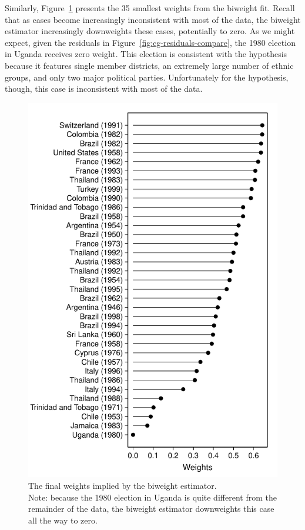 \documentclass[12pt]{article}
\begin{document}
Similarly, Figure~\ref{fig:cg-weights} presents the 35 smallest weights from the biweight fit. 
Recall that as cases become increasingly inconsistent with most of the data, the biweight estimator increasingly downweights these cases, potentially to zero. 
As we might expect, given the residuals in Figure~\ref{fig:cg-residuals-compare}, the 1980 election in Uganda receives zero weight. 
This election is consistent with the hypothesis because it features single member districts, an extremely large number of ethnic groups, and only two major political parties. 
Unfortunately for the hypothesis, though, this case is inconsistent with most of the data.

\begin{figure}[h!]
\begin{center}
\includegraphics[scale = 0.7]{figs/cg-weights.pdf}
\caption{The final weights implied by the biweight estimator. \\
Note: because the 1980 election in Uganda is quite different from the remainder of the data, the biweight estimator downweights this case all the way to zero.}\label{fig:cg-weights}
\end{center}
\end{figure}
\end{document}
